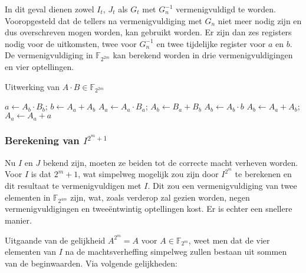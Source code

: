 In dit geval dienen zowel $I_t$, $J_t$ als $G_t$ met $G_n^{-1}$ vermenigvuldigd te worden. Vooropgesteld dat de tellers na vermenigvuldiging met $G_n$ niet meer nodig zijn en dus overschreven mogen worden, kan  gebruikt worden. Er zijn dan zes registers nodig voor de uitkomsten, twee voor $G_n^{-1}$ en twee tijdelijke register voor $a$ en $b$. De vermenigvuldiging in $\mathbb{F}_{2^{2m}}$ kan berekend worden in drie vermenigvuldigingen en vier optellingen.

\begin{algorithm}[h]
	\caption{Uitwerking van $A \cdot B \in \mathbb{F}_{2^{2m}}$}
	\label{algoritme-implementatie-miller-f2m-mult}
	$a \gets A_b \cdot B_b$; $b \gets A_a + A_b$\;
	$A_a \gets A_a \cdot B_a$; $A_b \gets B_a + B_b$\;
	$A_b \gets A_b \cdot b$\;
	$A_b \gets A_a + A_b$; $A_a \gets A_a + a$\;
\end{algorithm}

\subsubsection{Berekening van $I^{2^m + 1}$}

Nu $I$ en $J$ bekend zijn, moeten ze beiden tot de correcte macht verheven worden. Voor $I$ is dat $2^m + 1$, wat simpelweg mogelijk zou zijn door $I^{2^m}$ te berekenen en dit resultaat te vermenigvuldigen met $I$. Dit zou een vermenigvuldiging van twee elementen in $\mathbb{F}_{2^{4m}}$ zijn, wat, zoals verderop zal gezien worden, negen vermenigvuldigingen en twee\"entwintig optellingen kost. Er is echter een snellere manier.

Uitgaande van de gelijkheid $A^{2^m} = A$ voor $A \in \mathbb{F}_{2^{m}}$, weet men dat de vier elementen van $I$ na de machtsverheffing simpelweg zullen bestaan uit sommen van de beginwaarden. Via volgende gelijkheden:

